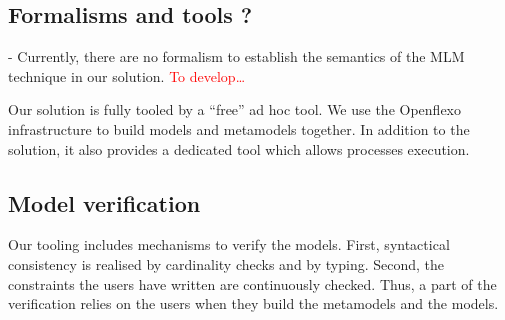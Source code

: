 

  
\subsection{Formalisms and tools ?}


-
Currently, there are no formalism to establish the semantics of the MLM
technique in our solution. \textcolor{red}{To develop…}

Our solution is fully tooled by a ``free'' ad hoc tool. We use the Openflexo
infrastructure to build models and metamodels together. In addition to the
solution, it also provides a dedicated tool which allows processes execution. 

\subsection{Model verification}


Our tooling includes mechanisms to verify the models. First, syntactical consistency is realised by cardinality checks and by typing. Second, the constraints the users have written are continuously checked. Thus, a part of the verification relies on the users when they build the metamodels and the models.